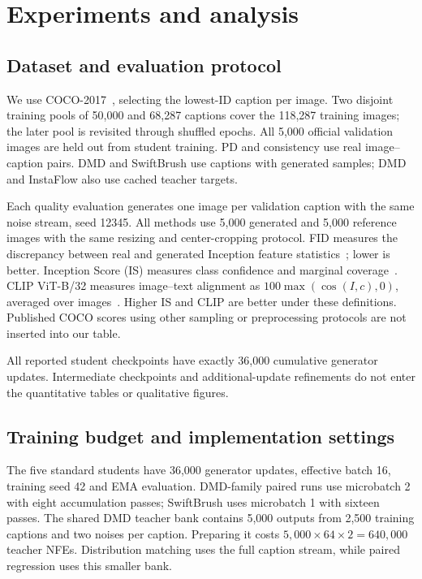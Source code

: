 \documentclass[10pt,twocolumn,letterpaper]{article}
\begin{document}
\section{Experiments and analysis}
\subsection{Dataset and evaluation protocol}
We use COCO-2017~\cite{chen2015coco}, selecting the lowest-ID caption per
image. Two disjoint training pools of 50,000 and 68,287 captions cover the
118,287 training images; the later pool is revisited through shuffled
epochs. All 5,000 official validation images are held out from student
training. PD and consistency use real image--caption pairs. DMD and
SwiftBrush use captions with generated samples; DMD and InstaFlow also use
cached teacher targets.

Each quality evaluation generates one image per validation caption with
the same noise stream, seed 12345. All methods use 5,000 generated and
5,000 reference images with the same resizing and center-cropping protocol.
FID measures the discrepancy between real and generated Inception feature
statistics~\cite{heusel2017fid}; lower is better. Inception Score (IS)
measures class confidence and marginal coverage~\cite{salimans2016improved}.
CLIP ViT-B/32 measures image--text alignment as
$100\max(\cos(I,c),0)$, averaged over images~\cite{hessel2021clipscore}.
Higher IS and CLIP are better under these definitions. Published COCO scores
using other sampling or preprocessing protocols are not inserted into our
table.

All reported student checkpoints have exactly 36,000 cumulative generator
updates. Intermediate checkpoints and additional-update refinements do not
enter the quantitative tables or qualitative figures.

\subsection{Training budget and implementation settings}
The five standard students have 36,000 generator updates, effective batch
16, training seed 42 and EMA evaluation. DMD-family paired runs use
microbatch 2 with eight accumulation passes; SwiftBrush uses microbatch 1
with sixteen passes. The shared DMD teacher bank contains 5,000 outputs from
2,500 training captions and two noises per caption. Preparing it costs
$5{,}000\times64\times2=640{,}000$ teacher NFEs. Distribution matching uses
the full caption stream, while paired regression uses this smaller bank.
\end{document}
